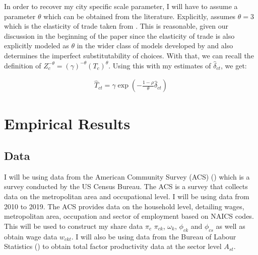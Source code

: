 \documentclass[10pt]{article}
\begin{document}




In order to recover my city specific scale parameter, I will have to assume a parameter $\theta$ which can be obtained from the literature. Explicitly, \cite{redding} assumes $\theta = 3$ which is the elasticity of trade taken from \cite{acm2010}. This is reasonable, given our discussion in the beginning of the paper since the elasticity of trade is also explicitly modeled as $\theta$ in the wider class of models developed by \cite{ek} and also determines the imperfect substitutability of choices. With that, we can recall the definition of $Z_c^{- \theta} = (\gamma)^{- \theta} (T_c)^{\theta}$. Using this with my estimates of $\hat{\delta}_{ct}$, we get:

\begin{align*}
    \hat{T}_{ct} = \gamma \exp \left( - \frac{1 - \rho}{\theta} \hat{\delta}_{ct} \right)
\end{align*}

\section{Empirical Results}

\subsection{Data}

I will be using data from the American Community Survey (ACS) (\cite{acs}) which is a survey conducted by the US Census Bureau. The ACS is a survey that collects data on the metropolitan area and occupational level. I will be using data from 2010 to 2019. The ACS provides data on the household level, detailing wages, metropolitan area, occupation and sector of employment based on NAICS codes. This will be used to construct my share data $\pi_c$ $\pi_{ck}$, $\omega_k$, $\phi_{ck}$ and $\phi_{cs}$ as well as obtain wage data $w_{ckt}$. I will also be using data from the Bureau of Labour Statistics (\cite{bls}) to obtain total factor productivity data at the sector level $A_{st}$.
\end{document}
